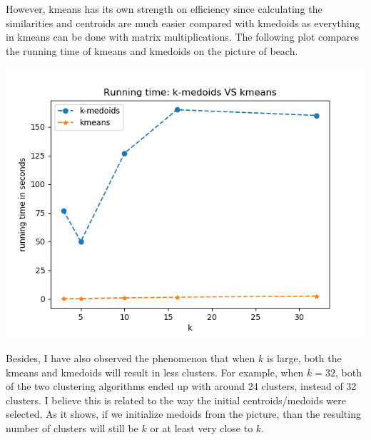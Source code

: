 \documentclass[twoside,10pt]{article}
\begin{document}
\begin{enumerate}
    However, kmeans has its own strength on efficiency since calculating the similarities and centroids are much easier compared with kmedoids as everything in kmeans can be done with matrix multiplications. The following plot compares the running time of kmeans and kmedoids on the picture of beach.
    \begin{center}
        \includegraphics[scale=.5]{run_time_compare.png}
    \end{center}
    
    Besides, I have also observed the phenomenon that when $k$ is large, both the kmeans and kmedoids will result in less clusters. For example, when $k = 32$, both of the two clustering algorithms ended up with around 24 clusters, instead of 32 clusters. I believe this is related to the way the initial centroids/medoids were selected. As it shows, if we initialize medoids from the picture, than the resulting number of clusters will still be $k$ or at least very close to $k$.

\end{enumerate}
\end{document}
